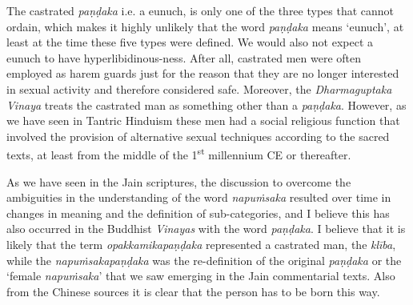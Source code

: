 The castrated \textit{paṇḍaka} i.e. a eunuch, is only one of the three types that cannot ordain, which makes it highly unlikely that the word \textit{paṇḍaka} means `eunuch', at least at the time these five types were defined. We would also not expect a eunuch to have hyperlibidinous-ness. After all, castrated men were often employed as harem guards just for the reason that they are no longer interested in sexual activity and therefore considered safe. Moreover, the \textit{Dharmaguptaka} \textit{Vinaya} treats the castrated man as something other than a \textit{paṇḍaka}. However, as we have seen in Tantric Hinduism these men had a social religious function that involved the provision of alternative sexual techniques according to the sacred texts, at least from the middle of the 1\textsuperscript{st} millennium CE or thereafter.

As we have seen in the Jain scriptures, the discussion to overcome the ambiguities in the understanding of the word \textit{napuṁsaka} resulted over time in changes in meaning and the definition of sub-categories, and I believe this has also occurred in the Buddhist \textit{Vinayas} with the word \textit{paṇḍaka}. I believe that it is likely that the term \textit{opakkamikapaṇḍaka} represented a castrated man, the \textit{klība}, while the \textit{napuṁsakapaṇḍaka} was the re-definition of the original \textit{paṇḍaka} or the `female \textit{napuṁsaka}' that we saw emerging in the Jain commentarial texts. Also from the Chinese sources it is clear that the person has to be born this way.

